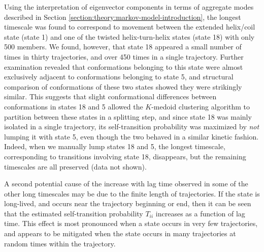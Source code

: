 Using the interpretation of eigenvector components in terms of aggregate modes described in Section \ref{section:theory:markov-model-introduction}, the longest timescale was found to correspond to movement between the extended helix/coil state (state 1) and one of the twisted helix-turn-helix states (state 18) with only 500 members.  
We found, however, that state 18 appeared a small number of times in thirty trajectories, and over 450 times in a single trajectory.
Further examination revealed that conformations belonging to this state were almost exclusively adjacent to conformations belonging to state 5, and structural comparison of conformations of these two states showed they were strikingly similar.
This suggests that slight conformational differences between conformations in states 18 and 5 allowed the $K$-medoid clustering algorithm to partition between these states in a splitting step, and since state 18 was mainly isolated in a single trajectory, its self-transition probability was maximized by \emph{not} lumping it with state 5, even though the two behaved in a similar kinetic fashion.
Indeed, when we manually lump states 18 and 5, the longest timescale, corresponding to transitions involving state 18, disappears, but the remaining timescales are all preserved (data not shown).

A second potential cause of the increase with lag time observed 
in some of the other long timescales
may be due to the finite length of trajectories.
If the state is long-lived, and occurs near the trajectory beginning or end, then it can be seen that the estimated self-transition probability $T_{ii}$ increases as a function of lag time.
This effect is most pronounced when a state occurs in very few trajectories, and appears to be mitigated when the state occurs in many trajectories at random times within the trajectory.
          
